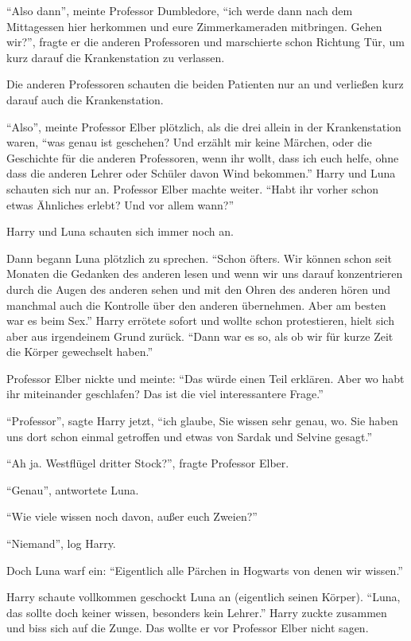 \enquote{Also dann}, meinte Professor Dumbledore, \enquote{ich werde dann nach dem Mittagessen hier herkommen und eure Zimmerkameraden mitbringen. Gehen wir?}, fragte er die anderen Professoren und marschierte schon Richtung Tür, um kurz darauf die Krankenstation zu verlassen.

Die anderen Professoren schauten die beiden Patienten nur an und verließen kurz darauf auch die Krankenstation.

\enquote{Also}, meinte Professor Elber plötzlich, als die drei allein in der Krankenstation waren, \enquote{was genau ist geschehen? Und erzählt mir keine Märchen, oder die Geschichte für die anderen Professoren, wenn ihr wollt, dass ich euch helfe, ohne dass die anderen Lehrer oder Schüler davon Wind bekommen.} Harry und Luna schauten sich nur an. Professor Elber machte weiter. \enquote{Habt ihr vorher schon etwas Ähnliches erlebt? Und vor allem wann?}

Harry und Luna schauten sich immer noch an.

Dann begann Luna plötzlich zu sprechen. \enquote{Schon öfters. Wir können schon seit Monaten die Gedanken des anderen lesen und wenn wir uns darauf konzentrieren durch die Augen des anderen sehen und mit den Ohren des anderen hören und manchmal auch die Kontrolle über den anderen übernehmen. Aber am besten war es beim Sex.} Harry errötete sofort und wollte schon protestieren, hielt sich aber aus irgendeinem Grund zurück. \enquote{Dann war es so, als ob wir für kurze Zeit die Körper gewechselt haben.}

Professor Elber nickte und meinte: \enquote{Das würde einen Teil erklären. Aber wo habt ihr miteinander geschlafen? Das ist die viel interessantere Frage.}

\enquote{Professor}, sagte Harry jetzt, \enquote{ich glaube, Sie wissen sehr genau, wo. Sie haben uns dort schon einmal getroffen und etwas von Sardak und Selvine gesagt.}

\enquote{Ah ja. Westflügel dritter Stock?}, fragte Professor Elber.

\enquote{Genau}, antwortete Luna.

\enquote{Wie viele wissen noch davon, außer euch Zweien?}

\enquote{Niemand}, log Harry.

Doch Luna warf ein: \enquote{Eigentlich alle Pärchen in Hogwarts von denen wir wissen.}

Harry schaute vollkommen geschockt Luna an (eigentlich seinen Körper). \enquote{Luna, das sollte doch keiner wissen, besonders kein Lehrer.} Harry zuckte zusammen und biss sich auf die Zunge. Das wollte er vor Professor Elber nicht sagen.

